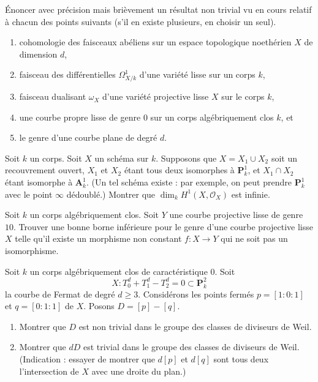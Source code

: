 \begin{exercise}[Théorèmes]
\label{exercise-results-spring-2020}
Énoncer avec précision mais brièvement un résultat non trivial vu en cours
relatif à chacun des points suivants (s'il en existe plusieurs, en choisir
un seul).
\begin{enumerate}
\item cohomologie des faisceaux abéliens sur un espace topologique noethérien
$X$ de dimension $d$,
\item faisceau des différentielles $\Omega^1_{X/k}$ d'une variété lisse
sur un corps $k$,
\item faisceau dualisant $\omega_X$ d'une variété projective lisse $X$
sur le corps $k$,
\item une courbe propre lisse
de genre $0$ sur un corps algébriquement clos $k$, et
\item le genre d'une courbe plane de degré $d$.
\end{enumerate}
\end{exercise}

\begin{exercise}
\label{exercise-coh-P1-infty-doubled}
Soit $k$ un corps. Soit $X$ un schéma sur $k$. Supposons que $X = X_1 \cup X_2$
soit un recouvrement ouvert, $X_1$ et $X_2$ étant tous deux isomorphes à $\mathbf{P}^1_k$,
et $X_1 \cap X_2$ étant isomorphe à $\mathbf{A}^1_k$. (Un tel schéma existe :
par exemple, on peut prendre $\mathbf{P}^1_k$ avec le point $\infty$ dédoublé.)
Montrer que $\dim_k H^1(X, \mathcal{O}_X)$ est infinie.
\end{exercise}

\begin{exercise}
\label{exercise-no-morphism}
Soit $k$ un corps algébriquement clos. Soit $Y$ une courbe projective lisse
de genre $10$. Trouver une bonne borne inférieure pour le
genre d'une courbe projective lisse
$X$ telle qu'il existe un morphisme non constant $f : X \to Y$
qui ne soit pas un isomorphisme.
\end{exercise}

\begin{exercise}
\label{exercise-element-order-n-in-pic}
Soit $k$ un corps algébriquement clos de caractéristique $0$.
Soit
$$
X : T_0^d + T_1^d - T_2^d = 0 \subset \mathbf{P}^2_k
$$
la courbe de Fermat de degré $d \geq 3$. Considérons les points fermés
$p = [1 : 0 : 1]$ et $q = [0 : 1 : 1]$ de $X$. Posons $D = [p] - [q]$.
\begin{enumerate}
\item Montrer que $D$ est non trivial dans le groupe des classes de diviseurs de Weil.
\item Montrer que $d D$ est trivial dans le groupe des classes de diviseurs de Weil.
(Indication : essayer de montrer que $d[p]$ et $d[q]$ sont tous deux l'intersection
de $X$ avec une droite du plan.)
\end{enumerate}
\end{exercise}

